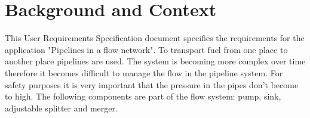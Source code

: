 \documentclass[12pt]{report}
\begin{document}

\restoregeometry 
\nopagecolor

\begingroup
\let\cleardoublepage\relax
\let\clearpage\relax
\section*{Background and Context}
This User Requirements Specification document specifies the requirements for the application "Pipelines in a flow network". To transport fuel from one place to another place pipelines are used. The  system is becoming more complex over time therefore it becomes difficult to manage the flow in the pipeline system. For safety purposes it is very important that the pressure in the pipes don't become to high. The following components are part of the flow system: pump, sink, adjustable splitter and merger.

\tableofcontents
\endgroup





\end{document}
